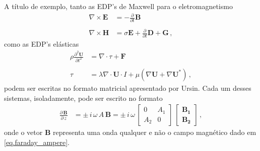 A t\'itulo de exemplo, tanto as EDP's de Maxwell para o eletromagnetismo
\begin{align}\label{eq.faraday_ampere}\nonumber
\nabla\times\mathbf{E}&=-\frac{\partial}{\partial t}\mathbf{B}\\\\\nonumber
\nabla\times\mathbf{H}&=\sigma\mathbf{E}+\frac{\partial}{\partial t}\mathbf{D}+\mathbf{G}\,,
\end{align}
como as EDP's el\'asticas
\begin{align}\label{eq.cauchy_hooke}\nonumber
\rho\frac{\partial^2 \mathbf{U}}{\partial t^2}&=\nabla\cdot\tau+\mathbf{F}\\\\\nonumber
\tau&=\lambda\nabla\cdot \mathbf{U}\cdot I + \mu(\nabla \mathbf{U}+\nabla \mathbf{U}^*)\,,
\end{align}
podem ser escritas no formato matricial apresentado por Ursin. Cada um desses sistemas, isoladamente, pode ser escrito no formato 
\begin{align}\label{eq.matricial}
\frac{\partial\,\mathbf{B}}{\partial\,z} &= \pm\,i\,\omega\,A\,\mathbf{B} = \pm\,i\,\omega\,
\begin{bmatrix}
0&A_1\\
A_2&0
\end{bmatrix}\,
\begin{bmatrix}
\mathbf{B_1}\\
\mathbf{B_2}	
\end{bmatrix}\,,
\end{align}
onde o vetor $\mathbf{B}$ representa uma onda qualquer e n\~ao o campo magn\'etico dado em \ref{eq.faraday_ampere}.

